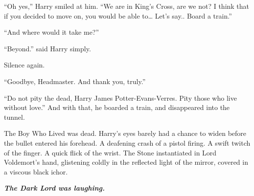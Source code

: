 “Oh yes,” Harry smiled at him. “We are in King’s Cross, are we not? I think that if you decided to move on, you would be able to… Let’s say.. Board a train.”

“And where would it take me?”

“Beyond.” said Harry simply.

Silence again.

“Goodbye, Headmaster. And thank you, truly.”

“Do not pity the dead, Harry James Potter-Evans-Verres. Pity those who live without love.” And with that, he boarded a train, and disappeared into the tunnel.
\simpleline
{}

\begin{flushright}
The Boy Who Lived was dead.
\SmallVSpace
Harry’s eyes barely had a chance to widen before the bullet entered his forehead.
\SomeVSpace
A deafening crash of a pistol firing.
\SmallVSpace
A swift twitch of the finger.
\SmallVSpace
A quick flick of the wrist.
\SomeVSpace
The Stone instantiated in Lord Voldemort’s hand, glistening coldly in the reflected light of the mirror, covered in a viscous black ichor.
\end{flushright}
\simpleline

\textbf{\textit{The Dark Lord was laughing.}}